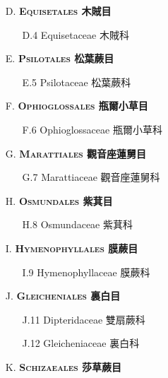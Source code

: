 \begin{enumerate}
  \item[D. ] \textbf{\textsc{Equisetales} 木賊目} 
    \begin{enumerate}
      \item[D.4] Equisetaceae 木賊科   
        
    \end{enumerate}
  \item[E. ] \textbf{\textsc{Psilotales} 松葉蕨目} 
    \begin{enumerate}
      \item[E.5] Psilotaceae 松葉蕨科   
        
    \end{enumerate}
  \item[F. ] \textbf{\textsc{Ophioglossales} 瓶爾小草目} 
    \begin{enumerate}
      \item[F.6] Ophioglossaceae 瓶爾小草科   
        
    \end{enumerate}
  \item[G. ] \textbf{\textsc{Marattiales} 觀音座蓮舅目} 
    \begin{enumerate}
      \item[G.7] Marattiaceae 觀音座蓮舅科   
        
    \end{enumerate}
  \item[H. ] \textbf{\textsc{Osmundales} 紫萁目} 
    \begin{enumerate}
      \item[H.8] Osmundaceae 紫萁科   
        
    \end{enumerate}
  \item[I. ] \textbf{\textsc{Hymenophyllales} 膜蕨目} 
    \begin{enumerate}
      \item[I.9] Hymenophyllaceae 膜蕨科   
        
    \end{enumerate}
  \item[J. ] \textbf{\textsc{Gleicheniales} 裏白目} 
    \begin{enumerate}
      \item[J.11] Dipteridaceae 雙扇蕨科   
        
      \item[J.12] Gleicheniaceae 裏白科   
        
    \end{enumerate}
  \item[K. ] \textbf{\textsc{Schizaeales} 莎草蕨目} 

\end{enumerate}
